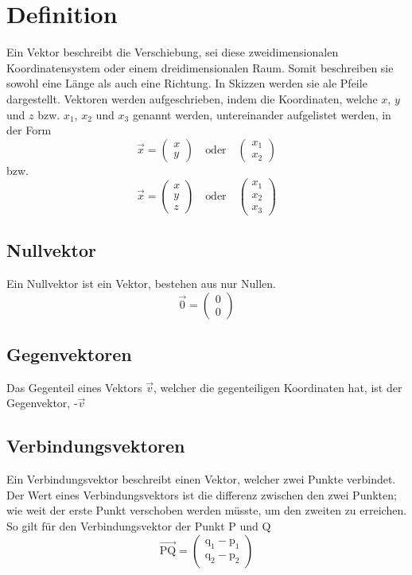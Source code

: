 \documentclass{article}
\begin{document}
 
\newcommand{\norm}[1]{\left| {#1} \right|}  
\newcommand{\vect}[1]{\overrightarrow{#1}} 
 
\section{Definition}
Ein Vektor beschreibt die Verschiebung, sei diese zweidimensionalen Koordinatensystem oder einem dreidimensionalen Raum. Somit beschreiben sie sowohl eine Länge als auch eine Richtung. In Skizzen werden sie ale Pfeile dargestellt. Vektoren werden aufgeschrieben, indem die Koordinaten, welche $x$, $y$ und $z$ bzw. $x_1$, $x_2$ und $x_3$ genannt werden, untereinander aufgelistet werden, in der Form 
\[
 \vect{x} = \begin{pmatrix} x \\ y \end{pmatrix}
 \quad \text{oder} \quad
 \begin{pmatrix} x_1 \\ x_2 \end{pmatrix}
\]
bzw. 
\[
 \vect{x} = \begin{pmatrix} x \\ y \\ z \end{pmatrix}
 \quad \text{oder} \quad
 \begin{pmatrix} x_1 \\ x_2 \\ x_3 \end{pmatrix}
\]
 
\subsection{Nullvektor}
Ein Nullvektor ist ein Vektor, bestehen aus nur Nullen.
\[
 \vect{0} = \begin{pmatrix} 0 \\ 0 \end{pmatrix}
\]
 
\subsection{Gegenvektoren}
Das Gegenteil eines Vektors $\vect{v}$, welcher die gegenteiligen Koordinaten hat, ist der Gegenvektor, -$\vect{v}$
 
\subsection{Verbindungsvektoren} 
Ein Verbindungsvektor beschreibt einen Vektor, welcher zwei Punkte verbindet. Der Wert eines Verbindungsvektors ist die differenz zwischen den zwei Punkten; wie weit der erste Punkt verschoben werden müsste, um den zweiten zu erreichen. So gilt für den Verbindungsvektor der Punkt $\mathrm{P}$ und $\mathrm{Q}$
\[
 \vect{\mathrm{PQ}} =
 \begin{pmatrix}
  \mathrm{q}_1 - \mathrm{p}_1 \\
  \mathrm{q}_2 - \mathrm{p}_2
 \end{pmatrix}
\]
 
\end{document}
